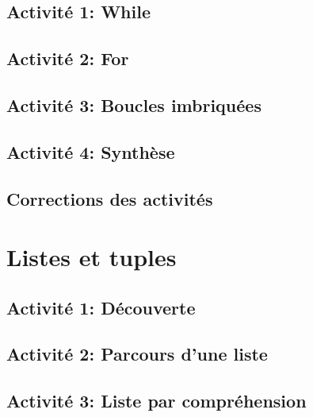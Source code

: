 \documentclass[
]{book}
\begin{document}
\hypertarget{activituxe9-1-while}{%
\section{Activité 1: While}\label{activituxe9-1-while}}

\hypertarget{activituxe9-2-for}{%
\section{Activité 2: For}\label{activituxe9-2-for}}

\hypertarget{activituxe9-3-boucles-imbriquuxe9es}{%
\section{Activité 3: Boucles imbriquées}\label{activituxe9-3-boucles-imbriquuxe9es}}

\hypertarget{activituxe9-4-synthuxe8se}{%
\section{Activité 4: Synthèse}\label{activituxe9-4-synthuxe8se}}

\hypertarget{corrections-des-activituxe9s}{%
\section{Corrections des activités}\label{corrections-des-activituxe9s}}

\hypertarget{listes-et-tuples}{%
\chapter{Listes et tuples}\label{listes-et-tuples}}

\hypertarget{activituxe9-1-duxe9couverte}{%
\section{Activité 1: Découverte}\label{activituxe9-1-duxe9couverte}}

\hypertarget{activituxe9-2-parcours-dune-liste}{%
\section{Activité 2: Parcours d'une liste}\label{activituxe9-2-parcours-dune-liste}}

\hypertarget{activituxe9-3-liste-par-compruxe9hension}{%
\section{Activité 3: Liste par compréhension}\label{activituxe9-3-liste-par-compruxe9hension}}
\end{document}
